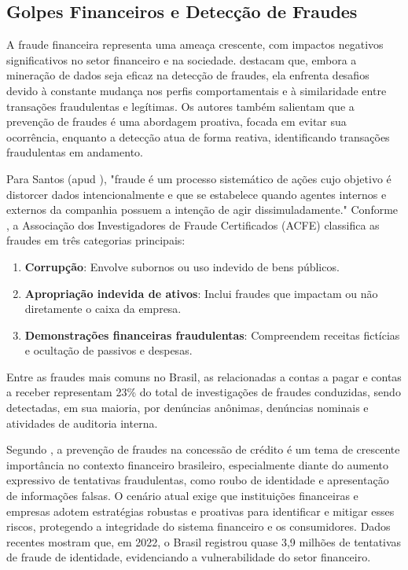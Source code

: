 \documentclass[12pt,a4paper]{article}
\begin{document}
\subsection{Golpes Financeiros e Detecção de Fraudes}
A fraude financeira representa uma ameaça crescente, com impactos negativos significativos no setor financeiro e na sociedade. \cite{martins2022} destacam que, embora a mineração de dados seja eficaz na detecção de fraudes, ela enfrenta desafios devido à constante mudança nos perfis comportamentais e à similaridade entre transações fraudulentas e legítimas. Os autores também salientam que a prevenção de fraudes é uma abordagem proativa, focada em evitar sua ocorrência, enquanto a detecção atua de forma reativa, identificando transações fraudulentas em andamento.

Para Santos (apud \cite{soares2024}), "fraude é um processo sistemático de ações cujo objetivo é distorcer dados intencionalmente e que se estabelece quando agentes internos e externos da companhia possuem a intenção de agir dissimuladamente." Conforme \cite{soares2024}, a Associação dos Investigadores de Fraude Certificados (ACFE) classifica as fraudes em três categorias principais:
\begin{enumerate}
    \item \textbf{Corrupção}: Envolve subornos ou uso indevido de bens públicos.
    \item \textbf{Apropriação indevida de ativos}: Inclui fraudes que impactam ou não diretamente o caixa da empresa.
    \item \textbf{Demonstrações financeiras fraudulentas}: Compreendem receitas fictícias e ocultação de passivos e despesas.
\end{enumerate}

Entre as fraudes mais comuns no Brasil, as relacionadas a contas a pagar e contas a receber representam 23\% do total de investigações de fraudes conduzidas, sendo detectadas, em sua maioria, por denúncias anônimas, denúncias nominais e atividades de auditoria interna.

Segundo \cite{thinkdata2024}, a prevenção de fraudes na concessão de crédito é um tema de crescente importância no contexto financeiro brasileiro, especialmente diante do aumento expressivo de tentativas fraudulentas, como roubo de identidade e apresentação de informações falsas. O cenário atual exige que instituições financeiras e empresas adotem estratégias robustas e proativas para identificar e mitigar esses riscos, protegendo a integridade do sistema financeiro e os consumidores. Dados recentes mostram que, em 2022, o Brasil registrou quase 3,9 milhões de tentativas de fraude de identidade, evidenciando a vulnerabilidade do setor financeiro.
\end{document}
